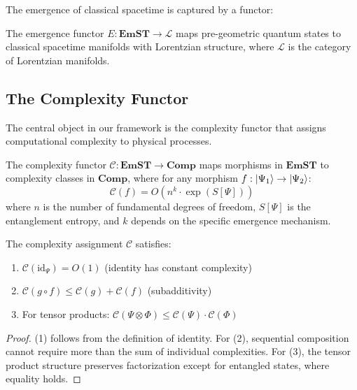 \documentclass[12pt,a4paper]{article}
\newcommand{\comp}[1]{\mathcal{C}(#1)}
\newcommand{\ent}[1]{S[#1]}
\newcommand{\lorentz}{\mathcal{L}}
\newcommand{\emst}{\mathbf{EmST}}
\newcommand{\cat}[1]{\mathbf{#1}}
\begin{document}
The emergence of classical spacetime is captured by a functor:

\begin{definition}
The emergence functor $E: \emst \to \lorentz$ maps pre-geometric quantum states to classical spacetime manifolds with Lorentzian structure, where $\lorentz$ is the category of Lorentzian manifolds.
\end{definition}

\subsection{The Complexity Functor}

The central object in our framework is the complexity functor that assigns computational complexity to physical processes.

\begin{definition}
The complexity functor $\mathcal{C}: \emst \to \cat{Comp}$ maps morphisms in $\emst$ to complexity classes in $\cat{Comp}$, where for any morphism $f: \ket{\Psi_1} \to \ket{\Psi_2}$:
\begin{equation}
\comp{f} = O(n^k \cdot \exp(\ent{\Psi}))
\end{equation}
where $n$ is the number of fundamental degrees of freedom, $\ent{\Psi}$ is the entanglement entropy, and $k$ depends on the specific emergence mechanism.
\end{definition}

\begin{theorem}
The complexity assignment $\mathcal{C}$ satisfies:
\begin{enumerate}
\item $\comp{\text{id}_\Psi} = O(1)$ (identity has constant complexity)
\item $\comp{g \circ f} \leq \comp{g} + \comp{f}$ (subadditivity)
\item For tensor products: $\comp{\Psi \otimes \Phi} \leq \comp{\Psi} \cdot \comp{\Phi}$
\end{enumerate}
\end{theorem}

\begin{proof}
(1) follows from the definition of identity. For (2), sequential composition cannot require more than the sum of individual complexities. For (3), the tensor product structure preserves factorization except for entangled states, where equality holds.
\end{proof}
\end{document}
